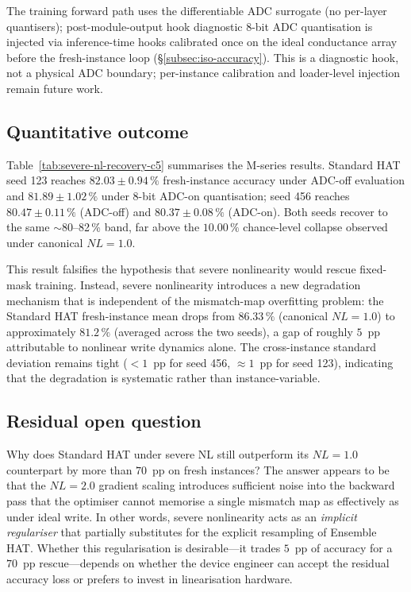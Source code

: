The training forward path uses the differentiable ADC surrogate (no per-layer quantisers); post-module-output hook diagnostic 8-bit ADC quantisation is injected via inference-time hooks calibrated once on the ideal conductance array before the fresh-instance loop (\S\ref{subsec:iso-accuracy}). This is a diagnostic hook, not a physical ADC boundary; per-instance calibration and loader-level injection remain future work.

\subsection{Quantitative outcome}

Table~\ref{tab:severe-nl-recovery-c5} summarises the M-series results.  Standard HAT seed 123 reaches $82.03\pm0.94\,\%$ fresh-instance accuracy under ADC-off evaluation and $81.89\pm1.02\,\%$ under 8-bit ADC-on quantisation; seed 456 reaches $80.47\pm0.11\,\%$ (ADC-off) and $80.37\pm0.08\,\%$ (ADC-on).  Both seeds recover to the same $\sim$80--82\,\% band, far above the $10.00\,\%$ chance-level collapse observed under canonical $NL=1.0$.

This result falsifies the hypothesis that severe nonlinearity would rescue fixed-mask training.  Instead, severe nonlinearity introduces a new degradation mechanism that is independent of the mismatch-map overfitting problem: the Standard HAT fresh-instance mean drops from $86.33\,\%$ (canonical $NL=1.0$) to approximately $81.2\,\%$ (averaged across the two seeds), a gap of roughly $5$~pp attributable to nonlinear write dynamics alone.  The cross-instance standard deviation remains tight ($<1$~pp for seed 456, $\approx 1$~pp for seed 123), indicating that the degradation is systematic rather than instance-variable.

\subsection{Residual open question}

Why does Standard HAT under severe NL still outperform its $NL=1.0$ counterpart by more than $70$~pp on fresh instances?  The answer appears to be that the $NL=2.0$ gradient scaling introduces sufficient noise into the backward pass that the optimiser cannot memorise a single mismatch map as effectively as under ideal write.  In other words, severe nonlinearity acts as an \emph{implicit regulariser} that partially substitutes for the explicit resampling of Ensemble HAT.  Whether this regularisation is desirable---it trades $5$~pp of accuracy for a $70$~pp rescue---depends on whether the device engineer can accept the residual accuracy loss or prefers to invest in linearisation hardware.


